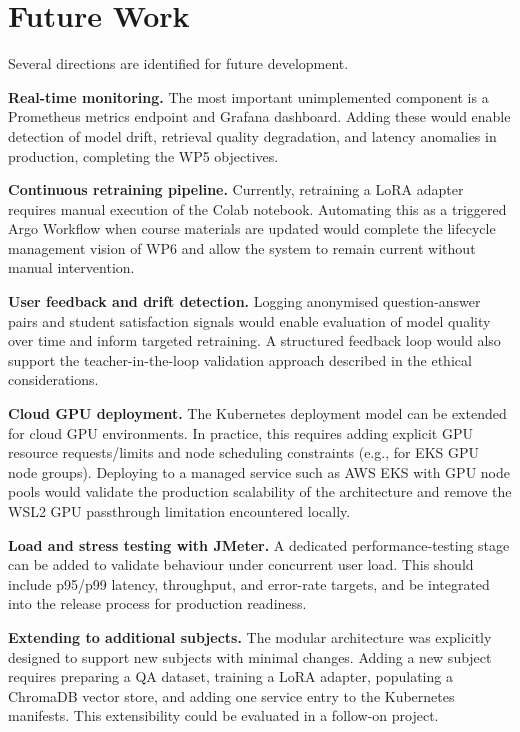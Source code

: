 \section{Future Work}

Several directions are identified for future development.

\textbf{Real-time monitoring.} The most important unimplemented component is a Prometheus metrics endpoint and Grafana dashboard. Adding these would enable detection of model drift, retrieval quality degradation, and latency anomalies in production, completing the WP5 objectives.

\textbf{Continuous retraining pipeline.} Currently, retraining a LoRA adapter requires manual execution of the Colab notebook. Automating this as a triggered Argo Workflow when course materials are updated would complete the lifecycle management vision of WP6 and allow the system to remain current without manual intervention.

\textbf{User feedback and drift detection.} Logging anonymised question-answer pairs and student satisfaction signals would enable evaluation of model quality over time and inform targeted retraining. A structured feedback loop would also support the teacher-in-the-loop validation approach described in the ethical considerations.

\textbf{Cloud GPU deployment.} The Kubernetes deployment model can be extended for cloud GPU environments. In practice, this requires adding explicit GPU resource requests/limits and node scheduling constraints (e.g., for EKS GPU node groups). Deploying to a managed service such as AWS EKS with GPU node pools would validate the production scalability of the architecture and remove the WSL2 GPU passthrough limitation encountered locally.

\textbf{Load and stress testing with JMeter.} A dedicated performance-testing stage can be added to validate behaviour under concurrent user load. This should include p95/p99 latency, throughput, and error-rate targets, and be integrated into the release process for production readiness.

\textbf{Extending to additional subjects.} The modular architecture was explicitly designed to support new subjects with minimal changes. Adding a new subject requires preparing a QA dataset, training a LoRA adapter, populating a ChromaDB vector store, and adding one service entry to the Kubernetes manifests. This extensibility could be evaluated in a follow-on project.


